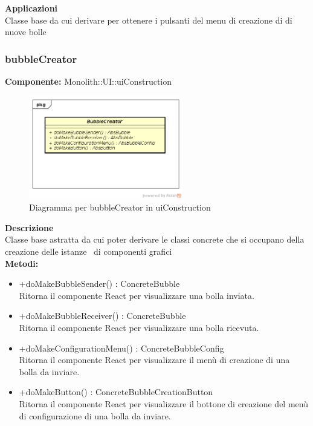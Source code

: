 \textbf{Applicazioni}\\
Classe base da cui derivare per ottenere i pulsanti del menu di creazione di di nuove bolle 


\clearpage

\subsubsection{bubbleCreator}
\textbf{Componente:}  Monolith::UI::uiConstruction\\
   \FloatBarrier
   \begin{figure}[ht]
   \centering
   \includegraphics[width=0.6\textwidth]{img/single-bubbleCreator.png}
   \caption{{Diagramma per bubbleCreator in uiConstruction}}
\end{figure}
\FloatBarrier
\textbf{Descrizione}\\
Classe base astratta da cui poter derivare le classi concrete che si occupano della creazione delle istanze  di componenti grafici  \\ 
\textbf{Metodi:}
\begin{itemize}
\item +doMakeBubbleSender() : ConcreteBubble 
\\
Ritorna il componente React per visualizzare una bolla inviata.
\item +doMakeBubbleReceiver() : ConcreteBubble 
\\
Ritorna il componente React per visualizzare una bolla ricevuta.
\item +doMakeConfigurationMenu() : ConcreteBubbleConfig 
\\
Ritorna il componente React per visualizzare il menù di creazione di una bolla da inviare.
\item +doMakeButton() : ConcreteBubbleCreationButton 
\\
Ritorna il componente React per visualizzare il bottone di creazione del menù di configurazione di una bolla da inviare.

\end{itemize} 


